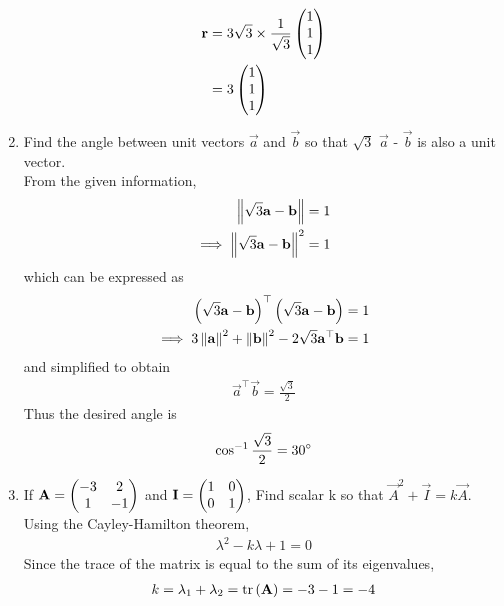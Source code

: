 \documentclass[journal,12pt,twocolumn]{IEEEtran}
\renewcommand\thesection{\arabic{section}}
\begin{document}
\begin{enumerate}[label=\thesection.\arabic*.,ref=\thesection.\theenumi]
  \begin{align}
	  \mathbf{r} &=  3\sqrt{3}\times \frac{1}{\sqrt{3}}\begin{pmatrix}1\\1\\1\end{pmatrix}
	  \\
		  &=3\begin{pmatrix}1\\1\\1\end{pmatrix}
	  \label{eq:equal_incline_unit_ans}
  \end{align}
\item Find the angle between unit vectors $\overrightarrow{a}$ and $\overrightarrow{b}$ so that $\sqrt{3}$ $\overrightarrow{a}$ - $\overrightarrow{b}$ is also a unit vector.\\
	\solution From the given information, 
  \begin{align}
	  \left\lVert	\sqrt{3}\mathbf{a} - \mathbf{b}\right\rVert &= 1
	  \\
	  \implies \left\lVert	\sqrt{3}\mathbf{a} - \mathbf{b}\right\rVert^2 &= 1
	  \label{eq:norm_unit}
  \end{align}
  which can be expressed as 
  \begin{align}
	  \left(	\sqrt{3}\mathbf{a} - \mathbf{b}\right)^{\top} \left(	\sqrt{3}\mathbf{a} - \mathbf{b}\right)&= 1
	  \\
	  \implies  3 \left\lVert\mathbf{a}\right\rVert^2  + \left\lVert\mathbf{b}\right\rVert^2 - 2 \sqrt{3} \mathbf{a}^{\top}\mathbf{b} &= 1
	  \label{eq:norm_unit_mid}
  \end{align}
  and simplified to obtain 
  \begin{align}
	\vec{a}^{\top}\vec{b}  =  \frac{\sqrt{3}}{2} 
	  \label{eq:norm_unit_mid_angle}
  \end{align}
  Thus the desired angle  is 
  \begin{align}
\cos^{-1}   \frac{\sqrt{3}}{2} = 30 \degree
	  \label{eq:norm_unit_mid_angle_ans}
  \end{align}
\item If $\mathbf{A}=\begin{pmatrix}-3 & 2 \\ 1 & -1\end{pmatrix} $ and $ \mathbf{I}=\begin{pmatrix}1 & 0 \\ 0 & 1\end{pmatrix}$, Find scalar k so that $\vec{A}^2 + \vec{I} = k\vec{A}$.\\
	\solution Using the Cayley-Hamilton theorem, 
  \begin{align}
	  \lambda^2 - k \lambda + 1 = 0
	  \label{eq:cayley_applic}
  \end{align}
  Since the trace of the matrix is equal to the sum of its eigenvalues, 
  \begin{align}
	   k  = \lambda_1+\lambda_2 = \text{tr}\left(\mathbf{A}\right) = -3-1 = -4
	  \label{eq:cayley_sol}
  \end{align}

\end{enumerate}
\end{document}
